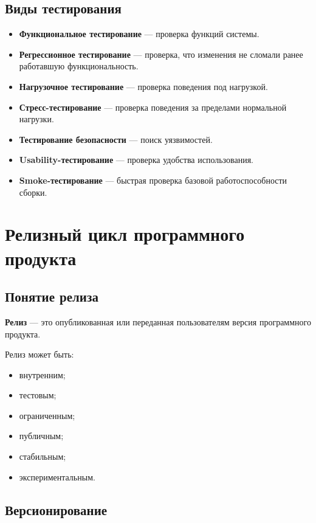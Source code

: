 \documentclass[12pt,a4paper]{article}
\begin{document}
\subsection{Виды тестирования}

\begin{itemize}
    \item \textbf{Функциональное тестирование} --- проверка функций системы.
    \item \textbf{Регрессионное тестирование} --- проверка, что изменения не сломали ранее работавшую функциональность.
    \item \textbf{Нагрузочное тестирование} --- проверка поведения под нагрузкой.
    \item \textbf{Стресс-тестирование} --- проверка поведения за пределами нормальной нагрузки.
    \item \textbf{Тестирование безопасности} --- поиск уязвимостей.
    \item \textbf{Usability-тестирование} --- проверка удобства использования.
    \item \textbf{Smoke-тестирование} --- быстрая проверка базовой работоспособности сборки.
\end{itemize}

\section{Релизный цикл программного продукта}

\subsection{Понятие релиза}

\textbf{Релиз} --- это опубликованная или переданная пользователям версия программного продукта.

Релиз может быть:
\begin{itemize}
    \item внутренним;
    \item тестовым;
    \item ограниченным;
    \item публичным;
    \item стабильным;
    \item экспериментальным.
\end{itemize}

\subsection{Версионирование}
\end{document}
